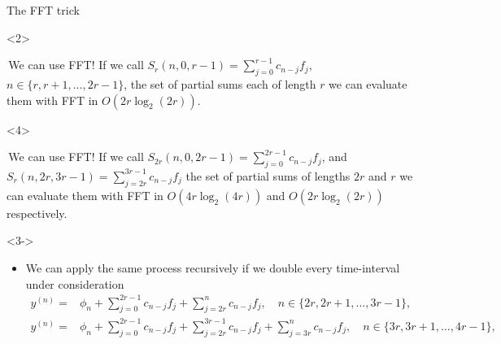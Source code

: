 \documentclass[aspectratio=169,xcolor=dvipsnames]{beamer}
\begin{document}
\begin{frame}{The FFT trick~\parencite{HairerFFTtrick}}
\begin{onlyenv}<2>
	\begin{exampleblock}{\faLightbulb\,We can use FFT!}
		If we call $S_r(n,0,r-1) = \sum_{j=0}^{r-1} c_{n-j}f_j$, $n \in \{r,r+1,\ldots,2r-1\}$, the set of partial sums each of length $r$ we can evaluate them with FFT in $O(2r \log_2(2r))$.
	\end{exampleblock}
\end{onlyenv}
\begin{onlyenv}<4>
	\begin{exampleblock}{\faLightbulb\,We can use FFT!}
		If we call $S_{2r}(n,0,2r-1) = \sum_{j=0}^{2r-1} c_{n-j}f_j$, and $S_{r}(n,2r,3r-1) = \sum_{j=2r}^{3r-1} c_{n-j}f_j$ the set of partial sums of lengths $2r$ and $r$ we can evaluate them with FFT in $O(4r \log_2(4r))$ and $O(2r \log_2(2r))$ respectively.
	\end{exampleblock}
\end{onlyenv}
\begin{onlyenv}<3->
\begin{itemize}
	\item<3-> We can apply the same process recursively if we double every time-interval under consideration
	\[
	\begin{split}
	y^{(n)} = & \phi_n + \sum_{j=0}^{2r-1} c_{n-j} f_j + \sum_{j=2r}^{n} c_{n-j} f_j, \quad n \in \{2r,2r+1,\ldots,3r-1\}, \\
	y^{(n)} = & \phi_n + \sum_{j=0}^{2r-1} c_{n-j} f_j + \sum_{j=2r}^{3r-1} c_{n-j} f_j + \sum_{j=3r}^{n} c_{n-j} f_j, \quad n \in \{3r,3r+1,\ldots,4r-1\},
	\end{split}
	\]
	
\end{itemize}
\end{onlyenv}
\end{frame}
\end{document}
